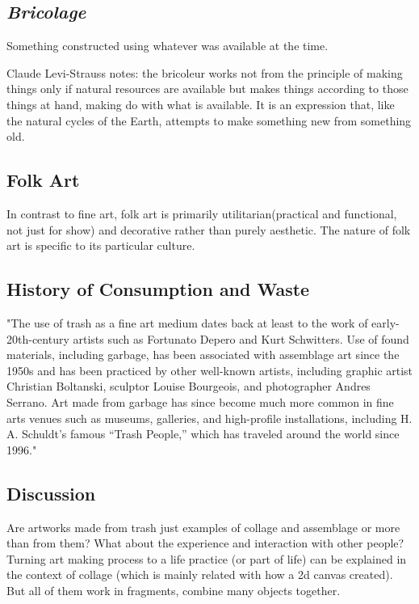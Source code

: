 \documentclass[12pt]{article}
\begin{document}
\subsection{\textit{Bricolage}}
Something constructed using whatever was available at the time.

Claude Levi-Strauss notes: the bricoleur works not from the principle of making things only if natural resources are available but makes things according to those things at hand, making do with what is available. It is an expression that, like the natural cycles of the Earth, attempts to make something new from something old. \cite{levi1966savage}

\subsection{Folk Art}
In contrast to fine art, folk art is primarily utilitarian(practical and functional, not just for show) and decorative rather than purely aesthetic. The nature of folk art is specific to its particular culture.

\subsection{History of Consumption and Waste}
"The use of trash as a fine art medium dates back at least to the work of early-20th-century artists such as Fortunato Depero and Kurt Schwitters. Use of found materials, including garbage, has been associated with assemblage art since the 1950s and has been practiced by other well-known artists, including graphic artist Christian Boltanski, sculptor Louise Bourgeois, and photographer Andres Serrano. Art made from garbage has since become much more common in fine arts venues such as museums, galleries, and high-profile installations, including H. A. Schuldt’s famous “Trash People,” which has traveled around the world since 1996." \cite{tauxe2012encyclopedia}

\subsection{Discussion}
Are artworks made from trash just examples of collage and assemblage or more than from them? What about the experience and interaction with other people? Turning art making process to a life practice (or part of life) can be explained in the context of collage (which is mainly related with how a 2d canvas created). But all of them work in fragments, combine many objects together. 
\end{document}
